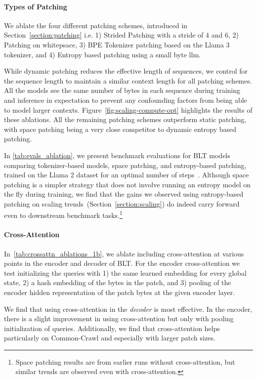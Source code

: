 \paragraph{Types of Patching}

We ablate the four different patching schemes, introduced in Section~\ref{section:patching} i.e. 1) Strided Patching with a stride of 4 and 6, 2) Patching on whitepsace, 3) BPE Tokenizer patching based on the Llama 3 tokenizer, and 4) Entropy based patching using a small byte llm. 

While dynamic patching reduces the effective length of sequences, we control for the sequence length to maintain a similar context length for all patching schemes. All the models see the same number of bytes in each sequence during training and inference in expectation to prevent any confounding factors from being able to model larger contexts. Figure~\ref{fig:scaling-compute-opt} highlights the results of these ablations. All the remaining patching schemes outperform static patching, with space patching being a very close competitor to dynamic entropy based patching. 

In \autoref{tab:evals_ablation}, we present benchmark evaluations for {\textsc BLT} models comparing tokenizer-based models, space patching, and entropy-based patching, trained on the Llama 2 dataset for an optimal number of steps~\citep{dubey2024llama}. Although space patching is a simpler strategy that does not involve running an entropy model on the fly during training, we find that the gains we observed using entropy-based patching on scaling trends~(Section~\ref{section:scaling}) do indeed carry forward even to downstream benchmark tasks.\footnote{Space patching results are from earlier runs without cross-attention, but similar trends are observed even with cross-attention.} 

\paragraph{Cross-Attention} 
In~\autoref{tab:crossattn_ablations_1b}, we ablate including cross-attention at various points in the encoder and decoder of {\textsc BLT}. For the encoder cross-attention we test initializing the queries with 1) the same learned embedding for every global state, 2) a hash embedding of the bytes in the patch, and 3) pooling of the encoder hidden representation of the patch bytes at the given encoder layer.

We find that using cross-attention in the \textit{decoder} is most effective. In the encoder, there is a slight improvement in using cross-attention but only with pooling initialization of queries. Additionally, we find that cross-attention helps particularly on Common-Crawl and especially with larger patch sizes.


